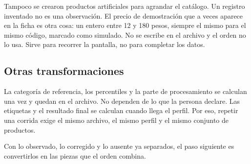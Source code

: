 Tampoco se crearon productos artificiales para agrandar el catálogo. Un registro inventado no es una observación. El precio de demostración que a veces aparece en la ficha es otra cosa: un entero entre 12 y 180 pesos, siempre el mismo para el mismo código, marcado como simulado. No se escribe en el archivo y el orden no lo usa. Sirve para recorrer la pantalla, no para completar los datos.

\subsection{Otras transformaciones}

La categoría de referencia, los percentiles y la parte de procesamiento se calculan una vez y quedan en el archivo. No dependen de lo que la persona declare. Las etiquetas y el resultado final se calculan cuando llega el perfil. Por eso, repetir una corrida exige el mismo archivo, el mismo perfil y el mismo conjunto de productos.

Con lo observado, lo corregido y lo ausente ya separados, el paso siguiente es convertirlos en las piezas que el orden combina.
